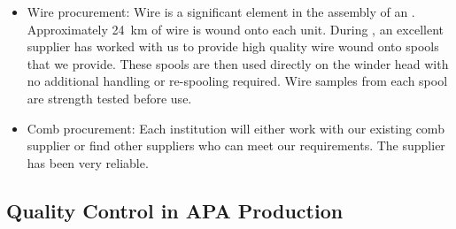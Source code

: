 \begin{itemize}
\item Wire procurement: Wire is a significant element in the assembly of an . Approximately \SI{24}{km} of wire is wound onto each unit. During , %
an excellent supplier %
has worked with us to provide high quality wire wound onto spools that we provide. These spools are then used directly on the winder head with no additional handling or re-spooling required. Wire samples from each spool are strength tested before use.

\item Comb procurement: Each institution will either work with our existing comb supplier or find other suppliers who can meet our requirements. The  supplier has been very reliable.


\end{itemize}


\subsection{Quality Control in APA Production}
\label{sec:fdsp-apa-prod-qc}




